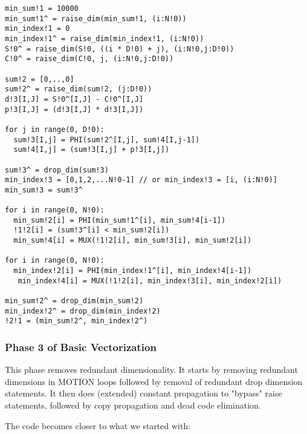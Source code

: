 {\small
\begin{verbatim}
min_sum!1 = 10000
min_sum!1^ = raise_dim(min_sum!1, (i:N!0))
min_index!1 = 0
min_index!1^ = raise_dim(min_index!1, (i:N!0))
S!0^ = raise_dim(S!0, ((i * D!0) + j), (i:N!0,j:D!0))
C!0^ = raise_dim(C!0, j, (i:N!0,j:D!0))

sum!2 = [0,..,0]
sum!2^ = raise_dim(sum!2, (j:D!0))
d!3[I,J] = S!0^[I,J] - C!0^[I,J]
p!3[I,J] = (d!3[I,J] * d!3[I,J])

for j in range(0, D!0):
  sum!3[I,j] = PHI(sum!2^[I,j], sum!4[I,j-1])       
  sum!4[I,j] = (sum!3[I,j] + p!3[I,j])

sum!3^ = drop_dim(sum!3)     
min_index!3 = [0,1,2,...N!0-1] // or min_index!3 = [i, (i:N!0)]
min_sum!3 = sum!3^

for i in range(0, N!0):
  min_sum!2[i] = PHI(min_sum!1^[i], min_sum!4[i-1]) 
  !1!2[i] = (sum!3^[i] < min_sum!2[i])
  min_sum!4[i] = MUX(!1!2[i], min_sum!3[i], min_sum!2[i])
    
for i in range(0, N!0):
  min_index!2[i] = PHI(min_index!1^[i], min_index!4[i-1])  
   min_index!4[i] = MUX(!1!2[i], min_index!3[i], min_index!2[i])

min_sum!2^ = drop_dim(min_sum!2)
min_index!2^ = drop_dim(min_index!2)   
!2!1 = (min_sum!2^, min_index!2^)
\end{verbatim}
}



\subsubsection{Phase 3 of Basic Vectorization}

This phase removes redundant dimensionality. 
It starts by removing redundant dimensions in MOTION loops followed
by removal of redundant drop dimension statements.
It then does (extended) constant propagation 
to "bypass" raise statements, followed by copy propagation
and dead code elimination.

The code becomes closer to what we started with:

